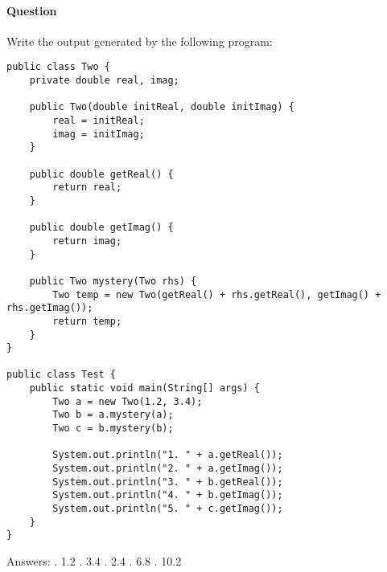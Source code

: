 \documentclass{article}
\begin{document}
\paragraph{Question }
Write the output generated by the following program:
\begin{lstlisting}
public class Two {
	private double real, imag;

	public Two(double initReal, double initImag) {
		real = initReal;
		imag = initImag;
	}

	public double getReal() {
		return real;
	}

	public double getImag() {
		return imag;
	}

	public Two mystery(Two rhs) {
		Two temp = new Two(getReal() + rhs.getReal(), getImag() + rhs.getImag());
		return temp;
	}
}

public class Test {
	public static void main(String[] args) {
		Two a = new Two(1.2, 3.4);
		Two b = a.mystery(a);
		Two c = b.mystery(b);

		System.out.println("1. " + a.getReal());
		System.out.println("2. " + a.getImag());
		System.out.println("3. " + b.getReal());
		System.out.println("4. " + b.getImag());
		System.out.println("5. " + c.getImag());
	}
}
\end{lstlisting}
{\color{red}Answers:
. 1.2
. 3.4
. 2.4
. 6.8
. 10.2}

\addtocounter{question_num}{1}
\end{document}
